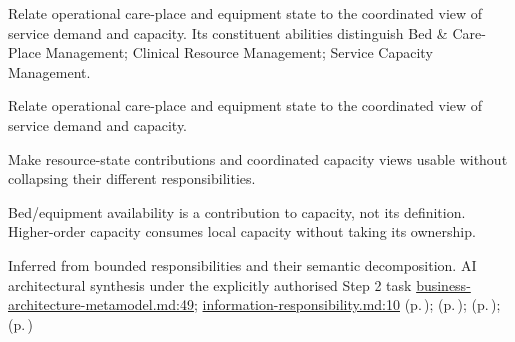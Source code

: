 Relate operational care-place and equipment state to the coordinated view of service demand and capacity. Its constituent abilities distinguish Bed \& Care-Place Management; Clinical Resource Management; Service Capacity Management.



Relate operational care-place and equipment state to the coordinated view of service demand and capacity.



Make resource-state contributions and coordinated capacity views usable without collapsing their different responsibilities.



Bed/\allowbreak{}equipment availability is a contribution to capacity, not its definition. Higher-order capacity consumes local capacity without taking its ownership.


Inferred from bounded responsibilities and their semantic decomposition. AI architectural synthesis under the explicitly authorised Step 2 task \hyperref[evidence:4bac85accd34ce0b]{business-architecture-metamodel.md:49}; \hyperref[evidence:be61392fefb4bb10]{information-responsibility.md:10}
 (p.\,\pageref{cap:bec-bed-care-place-management});  (p.\,\pageref{cap:bec-service-capacity-management});  (p.\,\pageref{cap:bec-reviewed-device-utilisation-administration});  (p.\,\pageref{cap:bec-reviewed-clinical-service-dependency-management})
